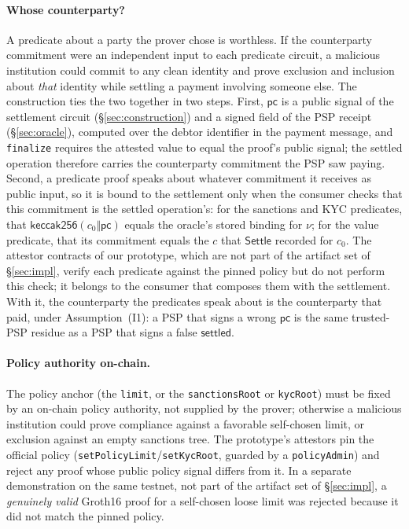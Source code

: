 \documentclass[11pt]{article}
\newcommand{\code}[1]{\texttt{#1}}
\begin{document}
\paragraph{Whose counterparty?}
A predicate about a party the prover chose is worthless. If the counterparty
commitment were an independent input to each predicate circuit, a malicious
institution could commit to any clean identity and prove exclusion and inclusion
about \emph{that} identity while settling a payment involving someone else. The
construction ties the two together in two steps. First, $\mathsf{pc}$ is a
public signal of the settlement circuit (\S\ref{sec:construction}) and a signed
field of the PSP receipt (\S\ref{sec:oracle}), computed over the debtor
identifier in the payment message, and \code{finalize} requires the attested
value to equal the proof's public signal; the settled operation therefore
carries the counterparty commitment the PSP saw paying. Second, a predicate
proof speaks about whatever commitment it receives as public input, so it is
bound to the settlement only when the consumer checks that this commitment is
the settled operation's: for the sanctions and KYC predicates, that
$\mathsf{keccak256}(c_0\Vert\mathsf{pc})$ equals the oracle's stored binding for
$\nu$; for the value predicate, that its commitment equals the $c$ that
$\mathsf{Settle}$ recorded for $c_0$. The attestor contracts of our prototype,
which are not part of the artifact set of \S\ref{sec:impl}, verify each
predicate against the pinned policy but do not perform this check; it belongs to
the consumer that composes them with the settlement. With it, the
counterparty the predicates speak about is the counterparty that paid, under
Assumption~(I1): a PSP that signs a wrong $\mathsf{pc}$ is the same trusted-PSP
residue as a PSP that signs a false $\mathsf{settled}$.

\paragraph{Policy authority on-chain.}
The policy anchor (the \code{limit}, or the \code{sanctionsRoot} or
\code{kycRoot}) must be fixed by an on-chain policy authority, not supplied by
the prover; otherwise a malicious institution could prove compliance against a
favorable self-chosen limit, or exclusion against an empty sanctions tree. The
prototype's attestors pin the official policy (\code{setPolicyLimit}/\code{setKycRoot},
guarded by a \code{policyAdmin}) and reject any proof whose public policy signal
differs from it. In a separate demonstration on the same testnet, not part of
the artifact set of \S\ref{sec:impl}, a \emph{genuinely valid} Groth16 proof for
a self-chosen loose limit was rejected because it did not match the pinned
policy.
\end{document}
